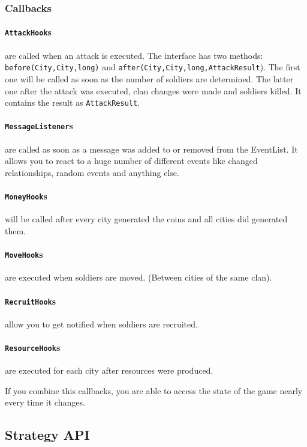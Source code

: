 \documentclass{article}
\begin{document}
\subsubsection{Callbacks}
\paragraph{\texttt{AttackHook}s} are called when an attack is executed. The interface has two methods: \texttt{before(City,City,long)} and \texttt{after(City,City,long,AttackResult}). The first one will
be called as soon as the number of soldiers are determined. The latter one after the attack was executed, clan changes were made and soldiers killed. It contains the result as \texttt{AttackResult}.
\paragraph{\texttt{MessageListener}s} are called as soon as a message was added to or removed from the EventList. It allows you to react to a huge number of different events like changed relationships, random events and anything else.
\paragraph{\texttt{MoneyHook}s} will be called after every city generated the coins and all cities did generated them.
\paragraph{\texttt{MoveHook}s} are executed when soldiers are moved. (Between cities of the same clan).  
\paragraph{\texttt{RecruitHook}s} allow you to get notified when soldiers are recruited.
\paragraph{\texttt{ResourceHook}s} are executed for each city after resources were produced.\newline

If you combine this callbacks, you are able to access the state of the game nearly every time it changes.
\subsection{Strategy API}
\end{document}
